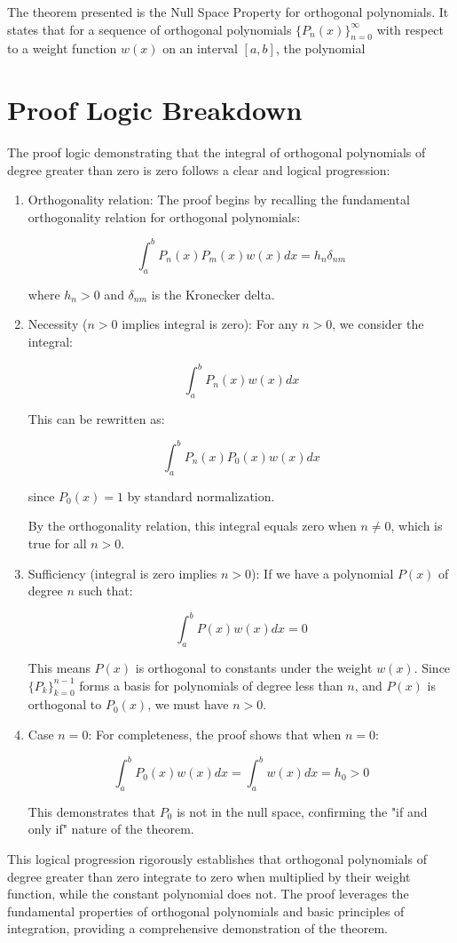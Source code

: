 \documentclass{article}
\begin{document}
The theorem presented is the Null Space Property for orthogonal polynomials. It states that for a sequence of orthogonal polynomials $\{P_n(x)\}_{n=0}^{\infty}$ with respect to a weight function $w(x)$ on an interval $[a,b]$, the polynomial

\section{Proof Logic Breakdown}
The proof logic demonstrating that the integral of orthogonal polynomials of degree greater than zero is zero follows a clear and logical progression:

\begin{enumerate}
\item Orthogonality relation: The proof begins by recalling the fundamental orthogonality relation for orthogonal polynomials:
    
    \[
    \int_a^bP_n(x)P_m(x)w(x)dx=h_n\delta_{nm}
    \]
    
    where $h_n>0$ and $\delta_{nm}$ is the Kronecker delta.

\item Necessity ($n > 0$ implies integral is zero):  
    For any $n>0$, we consider the integral:
    
    \[
    \int_a^bP_n(x)w(x)dx
    \]
    
    This can be rewritten as:
    
    \[
    \int_a^bP_n(x)P_0(x)w(x)dx
    \]
    
    since $P_0(x)=1$ by standard normalization.
    
    By the orthogonality relation, this integral equals zero when $n\neq 0$, which is true for all $n>0$.

\item Sufficiency (integral is zero implies $n > 0$):  
    If we have a polynomial $P(x)$ of degree $n$ such that:
    
    \[
    \int_a^bP(x)w(x)dx=0
    \]
    
    This means $P(x)$ is orthogonal to constants under the weight $w(x)$. Since $\{P_k\}_{k=0}^{n-1}$ forms a basis for polynomials of degree less than $n$, and $P(x)$ is orthogonal to $P_0(x)$, we must have $n>0$.

\item Case $n = 0$:  
    For completeness, the proof shows that when $n=0$:
    
    \[
    \int_a^bP_0(x)w(x)dx=\int_a^bw(x)dx=h_0>0
    \]
    
    This demonstrates that $P_0$ is not in the null space, confirming the "if and only if" nature of the theorem.
\end{enumerate}

This logical progression rigorously establishes that orthogonal polynomials of degree greater than zero integrate to zero when multiplied by their weight function, while the constant polynomial does not. The proof leverages the fundamental properties of orthogonal polynomials and basic principles of integration, providing a comprehensive demonstration of the theorem.
\end{document}
